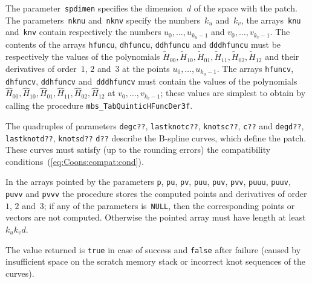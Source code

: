 The parameter~\texttt{spdimen} specifies the dimension~$d$ of the space with
the patch. The parameters~\texttt{nknu} and~\texttt{nknv} specify the
numbers~$k_u$ and~$k_v$, the arrays~\texttt{knu} and~\texttt{knv} contain
respectively the numbers $u_0,\ldots,u_{k_u-1}$ and $v_0,\ldots,v_{k_v-1}$.
The contents of the arrays \texttt{hfuncu}, \texttt{dhfuncu}, \texttt{ddhfuncu}
and \texttt{dddhfuncu} must be respectively the values of the polynomials
$\tilde{H}_{00},\tilde{H}_{10},\tilde{H}_{01},\tilde{H}_{11},\tilde{H}_{02},\tilde{H}_{12}$
and their derivatives of order~$1$, $2$ and~$3$ at the points
$u_0,\ldots,u_{k_u-1}$. The arrays \texttt{hfuncv}, \texttt{dhfuncv},
\texttt{ddhfuncv} and~\texttt{dddhfuncv} must contain the values of the polynomials
$\hat{H}_{00},\hat{H}_{10},\hat{H}_{01},\hat{H}_{11},\hat{H}_{02},\hat{H}_{12}$
at $v_0,\ldots,v_{k_v-1}$; these values are simplest to obtain by calling
the procedure \texttt{mbs\_TabQuinticHFuncDer3f}.

\begin{sloppypar}
The quadruples of parameters \texttt{degc??}, \texttt{lastknotc??}, \texttt{knotsc??},
\texttt{c??} and \texttt{degd??}, \texttt{lastknotd??}, \texttt{knotsd??}
\texttt{d??} describe the B-spline curves, which define the patch.
These curves must satisfy (up to the rounding errors)
the compatibility conditions~(\ref{eq:Coons:compat:cond}).%
\end{sloppypar}

In the arrays pointed by the parameters \texttt{p}, \texttt{pu}, \texttt{pv},
\texttt{puu}, \texttt{puv}, \texttt{pvv}, \texttt{puuu}, \texttt{puuv},
\texttt{puvv} and \texttt{pvvv} the procedure stores the computed
points and derivatives of order $1$, $2$ and~$3$; if any of the parameters
is~\texttt{NULL}, then the corresponding points or vectors are not computed.
Otherwise the pointed array must have length at least~$k_uk_vd$.

The value returned is \texttt{true} in case of success and \texttt{false}
after failure (caused by insufficient space on the scratch memory stack
or incorrect knot sequences of the curves).


